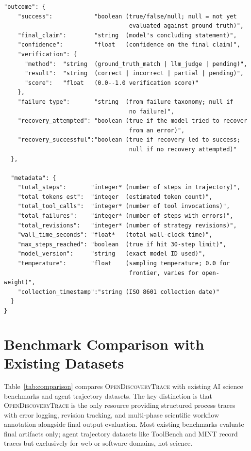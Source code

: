 \documentclass{article}
\newcommand{\dataset}{\textsc{OpenDiscoveryTrace}\xspace}
\begin{document}
\begin{lstlisting}[style=json, caption={Complete \dataset JSON schema for a single trajectory.}, label=lst:schema]
  "outcome": {
    "success":            "boolean (true/false/null; null = not yet
                                    evaluated against ground truth)",
    "final_claim":        "string  (model's concluding statement)",
    "confidence":         "float   (confidence on the final claim)",
    "verification": {
      "method":  "string  (ground_truth_match | llm_judge | pending)",
      "result":  "string  (correct | incorrect | partial | pending)",
      "score":   "float   (0.0--1.0 verification score)"
    },
    "failure_type":       "string  (from failure taxonomy; null if
                                    no failure)",
    "recovery_attempted": "boolean (true if the model tried to recover
                                    from an error)",
    "recovery_successful":"boolean (true if recovery led to success;
                                    null if no recovery attempted)"
  },

  "metadata": {
    "total_steps":       "integer* (number of steps in trajectory)",
    "total_tokens_est":  "integer  (estimated token count)",
    "total_tool_calls":  "integer* (number of tool invocations)",
    "total_failures":    "integer* (number of steps with errors)",
    "total_revisions":   "integer* (number of strategy revisions)",
    "wall_time_seconds": "float*   (total wall-clock time)",
    "max_steps_reached": "boolean  (true if hit 30-step limit)",
    "model_version":     "string   (exact model ID used)",
    "temperature":       "float    (sampling temperature; 0.0 for
                                    frontier, varies for open-weight)",
    "collection_timestamp":"string (ISO 8601 collection date)"
  }
}
\end{lstlisting}

\section{Benchmark Comparison with Existing Datasets}
\label{app:comparison}



Table~\ref{tab:comparison} compares \dataset with existing AI science benchmarks and agent trajectory datasets. The key distinction is that \dataset is the only resource providing structured process traces with error logging, revision tracking, and multi-phase scientific workflow annotation alongside final output evaluation. Most existing benchmarks evaluate final artifacts only; agent trajectory datasets like ToolBench and MINT record traces but exclusively for web or software domains, not science.
\end{document}
